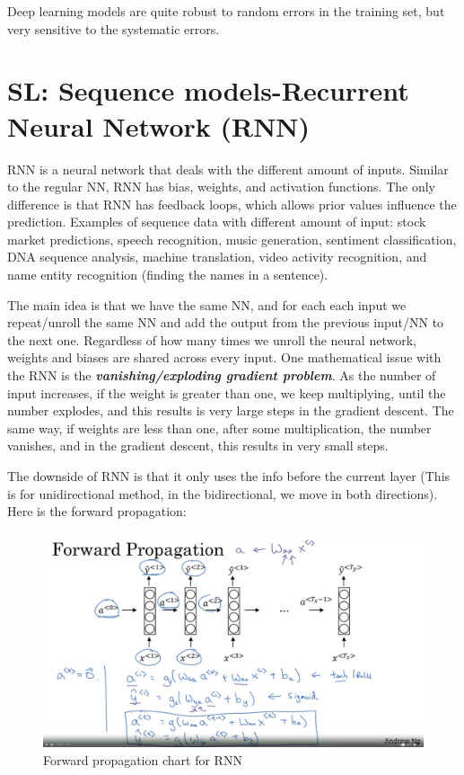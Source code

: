 \documentclass[12pt]{report}
\begin{document}
Deep learning models are quite robust to random errors in the training set, but very sensitive to the systematic errors.

\section{SL: Sequence models-Recurrent Neural Network (RNN)}

RNN is a neural network that deals with the different amount of inputs. Similar to the regular NN, RNN has bias, weights, and activation functions. The only difference is that RNN has feedback loops, which allows prior values influence the prediction. Examples of sequence data with different amount of input: stock market predictions, speech recognition, music generation, sentiment classification, DNA sequence analysis, machine translation, video activity recognition, and name entity recognition (finding the names in a sentence).

The main idea is that we have the same NN, and for each each input we repeat/unroll the same NN and add the output from the previous input/NN to the next one. Regardless of how many times we unroll the neural network, weights and biases are shared across every input. One mathematical issue with the RNN is the \textbf{\textit{vanishing/exploding gradient problem}}. As the number of input increases, if the weight is greater than one, we keep multiplying, until the number explodes, and this results is very large steps in the gradient descent.  The same way, if weights are less than one, after some multiplication, the number vanishes, and in the gradient descent, this results in very small steps.

The downside of RNN is that it only uses the info before the current layer (This is for unidirectional method, in the bidirectional, we move in both directions). Here is the forward propagation:

\begin{figure}[H]
  \centering
  \includegraphics[trim =0.0cm 0.0cm 0.0cm 0.0cm, clip, scale=0.15]{pics/RNN.png}
  \caption{Forward propagation chart for RNN}
\end{figure}
\end{document}
